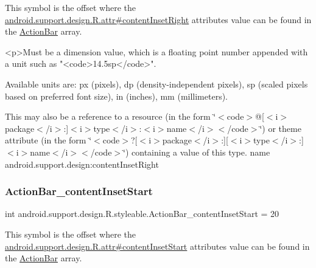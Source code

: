 This symbol is the offset where the \hyperlink{classandroid_1_1support_1_1design_1_1R_1_1attr_a6491aa248894c7643f5e77a4a345066c}{android.\+support.\+design.\+R.\+attr\#content\+Inset\+Right} attribute\textquotesingle{}s value can be found in the \hyperlink{classandroid_1_1support_1_1design_1_1R_1_1styleable_ab795220a96557d11f8c21359b95bed82}{Action\+Bar} array.

\begin{DoxyVerb}      <p>Must be a dimension value, which is a floating point number appended with a unit such as "<code>14.5sp</code>".
\end{DoxyVerb}
 Available units are\+: px (pixels), dp (density-\/independent pixels), sp (scaled pixels based on preferred font size), in (inches), mm (millimeters). 

This may also be a reference to a resource (in the form \char`\"{}$<$code$>$@\mbox{[}$<$i$>$package$<$/i$>$\+:\mbox{]}$<$i$>$type$<$/i$>$\+:$<$i$>$name$<$/i$>$$<$/code$>$\char`\"{}) or theme attribute (in the form \char`\"{}$<$code$>$?\mbox{[}$<$i$>$package$<$/i$>$\+:\mbox{]}\mbox{[}$<$i$>$type$<$/i$>$\+:\mbox{]}$<$i$>$name$<$/i$>$$<$/code$>$\char`\"{}) containing a value of this type.  name android.\+support.\+design\+:content\+Inset\+Right \mbox{\label{classandroid_1_1support_1_1design_1_1R_1_1styleable_a294d9e006ce1ce1efabd52d819b94bb8}} 
\subsubsection{\texorpdfstring{Action\+Bar\+\_\+content\+Inset\+Start}{ActionBar\_contentInsetStart}}
{\footnotesize\ttfamily int android.\+support.\+design.\+R.\+styleable.\+Action\+Bar\+\_\+content\+Inset\+Start = 20\hspace{0.3cm}{\ttfamily [static]}}

This symbol is the offset where the \hyperlink{classandroid_1_1support_1_1design_1_1R_1_1attr_ad3756cf8d5e48c3ed37e110730040fc9}{android.\+support.\+design.\+R.\+attr\#content\+Inset\+Start} attribute\textquotesingle{}s value can be found in the \hyperlink{classandroid_1_1support_1_1design_1_1R_1_1styleable_ab795220a96557d11f8c21359b95bed82}{Action\+Bar} array.

